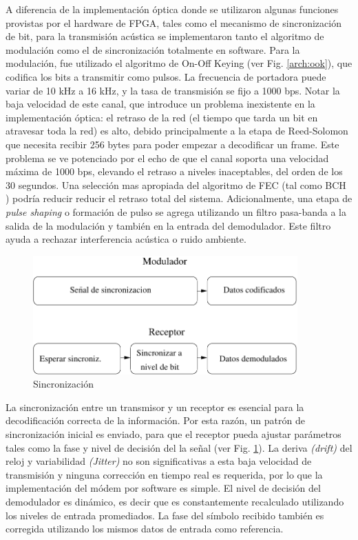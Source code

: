 A diferencia de la implementación óptica donde se utilizaron algunas funciones provistas por el hardware de FPGA, tales como el mecanismo de sincronización de bit, para la transmisión acústica se implementaron tanto el algoritmo de modulación como el de sincronización totalmente en software.
Para la modulación, fue utilizado el algoritmo de On-Off Keying (ver Fig. \ref{arch:ook}), que codifica los bits a transmitir como pulsos. La frecuencia de portadora puede variar de 10 kHz a 16 kHz, y la tasa de transmisión se fijo a 1000 bps. Notar la baja velocidad de este canal, que introduce un problema inexistente en la implementación óptica: el retraso de la red (el tiempo que tarda un bit en atravesar toda la red) es alto, debido principalmente a la etapa de Reed-Solomon que necesita recibir 256 bytes para poder empezar a decodificar un frame. Este problema se ve potenciado por el echo de que el canal soporta una velocidad máxima de 1000 bps, elevando el retraso a niveles inaceptables, del orden de los 30 segundos.
Una selección mas apropiada del algoritmo de FEC (tal como BCH \cite{Moon:05}) podría reducir reducir el retraso total del sistema.
Adicionalmente, una etapa de \textit{pulse shaping} o formación de pulso se agrega utilizando un filtro pasa-banda a la salida de la modulación y también en la entrada del demodulador. Este filtro ayuda a rechazar interferencia acústica o ruido ambiente.

\begin{figure}[t]
  \centering
    \includegraphics[width=4in]{graphs/Audio-Sync2.pdf}
    \caption{Sincronización}
    \label{arch:sync}
\end{figure}


La sincronización entre un transmisor y un receptor es esencial para la decodificación correcta de la información. Por esta razón, un patrón de sincronización inicial es enviado, para que el receptor pueda ajustar parámetros tales como la fase y nivel de decisión del la señal (ver Fig. \ref{arch:sync}). La deriva \textit{(drift)} del reloj y variabilidad \textit{(Jitter)} no son significativas a esta baja velocidad de transmisión y ninguna corrección en tiempo real es requerida, por lo que la implementación del módem por software es simple.
El nivel de decisión del demodulador es dinámico, es decir que es constantemente recalculado utilizando los niveles de entrada promediados.
La fase del símbolo recibido también es corregida utilizando los mismos datos de entrada como referencia.

